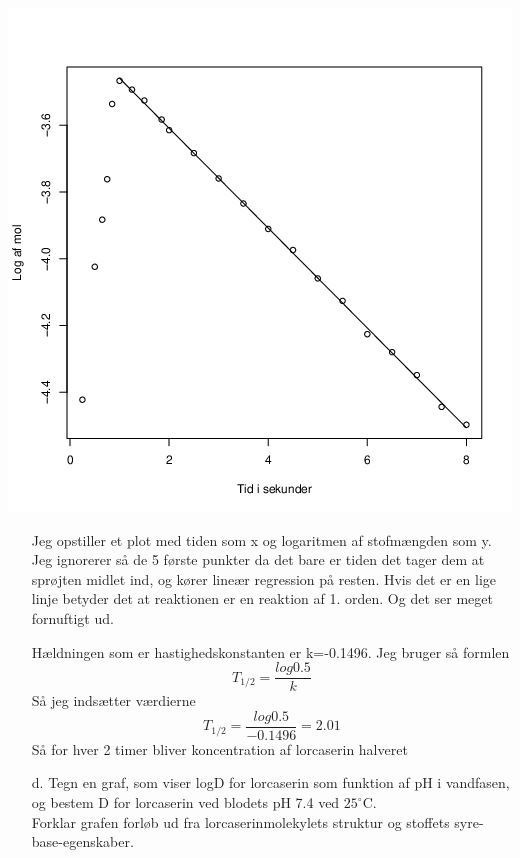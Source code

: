 \documentclass[12pt]{article}
\begin{document}
\includegraphics{c.png}
\begin{enumerate}
        \item[] Jeg opstiller et plot med tiden som x og logaritmen af stofmængden som y. Jeg ignorerer så de 5 første punkter da det bare er tiden det tager dem
                at sprøjten midlet ind, og kører lineær regression på resten. Hvis det er en lige linje betyder det at reaktionen er en reaktion af 1. orden.
                Og det ser meget fornuftigt ud.

                Hældningen som er hastighedskonstanten er k=-0.1496.
                Jeg bruger så formlen
                $$T_{1/2} = \frac{log{0.5}}{k}$$
                Så jeg indsætter værdierne
                $$T_{1/2} = \frac{log{0.5}}{-0.1496} = 2.01$$
                Så for hver 2 timer bliver koncentration af lorcaserin halveret

        \item[d.] Tegn en graf, som viser logD for lorcaserin som funktion af pH i vandfasen, og bestem D for lorcaserin ved
                blodets pH 7.4 ved $25^{\circ}$C.\\
                Forklar grafen forløb ud fra lorcaserinmolekylets struktur og stoffets syre-base-egenskaber.

\end{enumerate}
\end{document}
